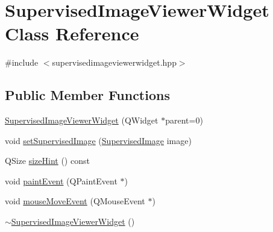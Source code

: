 \hypertarget{class_supervised_image_viewer_widget}{\section{Supervised\+Image\+Viewer\+Widget Class Reference}
\label{class_supervised_image_viewer_widget}
}


{\ttfamily \#include $<$supervisedimageviewerwidget.\+hpp$>$}

\subsection*{Public Member Functions}
\begin{DoxyCompactItemize}
\item 
\hyperlink{class_supervised_image_viewer_widget_a7cd34bfe711076b1c39516ce53fdfd3f}{Supervised\+Image\+Viewer\+Widget} (Q\+Widget $\ast$parent=0)
\item 
void \hyperlink{class_supervised_image_viewer_widget_a1ecae5d24940ff3bcbe8e09b85fef707}{set\+Supervised\+Image} (\hyperlink{class_supervised_image}{Supervised\+Image} image)
\item 
Q\+Size \hyperlink{class_supervised_image_viewer_widget_aa3c11a2c8303e270510ee0bac344cabb}{size\+Hint} () const 
\item 
void \hyperlink{class_supervised_image_viewer_widget_a2fd955c04cc44507f6c9d0b3fc43538c}{paint\+Event} (Q\+Paint\+Event $\ast$)
\item 
void \hyperlink{class_supervised_image_viewer_widget_a0ec0ea9962e394880410449e91181429}{mouse\+Move\+Event} (Q\+Mouse\+Event $\ast$)
\item 
\hyperlink{class_supervised_image_viewer_widget_a2fb137f85adea7909b800fa3e738a334}{$\sim$\+Supervised\+Image\+Viewer\+Widget} ()
\end{DoxyCompactItemize}
